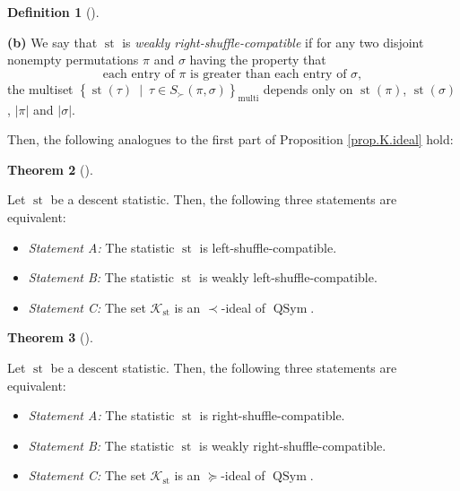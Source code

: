 \documentclass[numbers=enddot,12pt,final,onecolumn,notitlepage]{scrartcl}%
\theoremstyle{definition}
\newtheorem{theo}{Theorem}[section]
\newenvironment{theorem}[1][]
{\begin{theo}[#1]\begin{leftbar}}
{\end{leftbar}\end{theo}}
\newtheorem{defi}[theo]{Definition}
\newenvironment{definition}[1][]
{\begin{defi}[#1]\begin{leftbar}}
{\end{leftbar}\end{defi}}
\newenvironment{vershort}{}{}
\begin{document}
\begin{vershort}
\begin{definition}
\textbf{(b)} We say that $\operatorname*{st}$ is \textit{weakly
right-shuffle-compatible} if for any two disjoint nonempty permutations $\pi$
and $\sigma$ having the property that%
\[
\text{each entry of }\pi\text{ is greater than each entry of }\sigma,
\]
the multiset $\left\{  \operatorname*{st}\left(  \tau\right)  \ \mid\ \tau\in
S_{\succ}\left(  \pi,\sigma\right)  \right\}  _{\operatorname*{multi}}$
depends only on $\operatorname*{st}\left(  \pi\right)  $, $\operatorname*{st}%
\left(  \sigma\right)  $, $\left\vert \pi\right\vert $ and $\left\vert
\sigma\right\vert $.
\end{definition}

Then, the following analogues to the first part of Proposition
\ref{prop.K.ideal} hold:

\begin{theorem}
\label{thm.dendri.K.ideal}Let $\operatorname*{st}$ be a descent statistic.
Then, the following three statements are equivalent:

\begin{itemize}
\item \textit{Statement A:} The statistic $\operatorname*{st}$ is left-shuffle-compatible.

\item \textit{Statement B:} The statistic $\operatorname*{st}$ is weakly left-shuffle-compatible.

\item \textit{Statement C:} The set $\mathcal{K}_{\operatorname*{st}}$ is an
$\left.  \prec\right.  $-ideal of $\operatorname*{QSym}$.
\end{itemize}
\end{theorem}

\begin{theorem}
\label{thm.dendri.K.ideal-R}Let $\operatorname*{st}$ be a descent statistic.
Then, the following three statements are equivalent:

\begin{itemize}
\item \textit{Statement A:} The statistic $\operatorname*{st}$ is right-shuffle-compatible.

\item \textit{Statement B:} The statistic $\operatorname*{st}$ is weakly right-shuffle-compatible.

\item \textit{Statement C:} The set $\mathcal{K}_{\operatorname*{st}}$ is an
$\left.  \succeq\right.  $-ideal of $\operatorname*{QSym}$.
\end{itemize}
\end{theorem}


\end{vershort}
\end{document}
